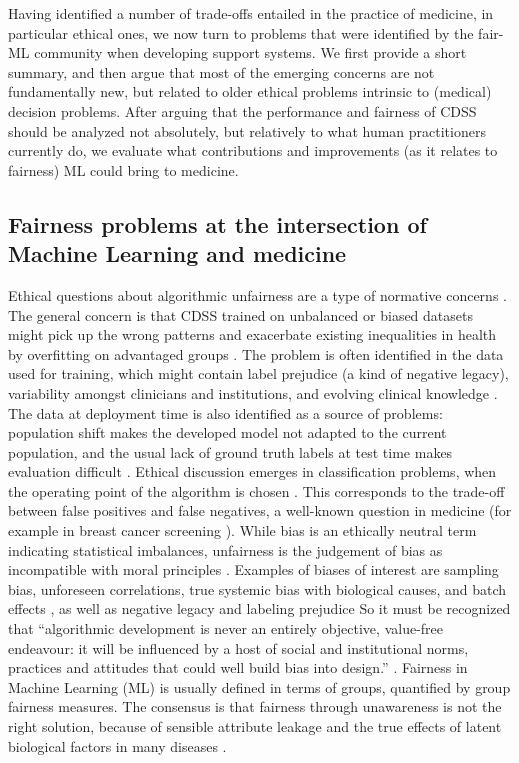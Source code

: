 Having identified a number of trade-offs entailed in the practice of medicine, in particular ethical ones, we now turn to problems that were identified by the fair-ML community when developing support systems.
We first provide a short summary, and then argue that most of the emerging concerns are not fundamentally new, but related to older ethical problems intrinsic to (medical) decision problems.
After arguing that the performance and fairness of CDSS should be analyzed not absolutely, but relatively to what human practitioners currently do,
we evaluate what contributions and improvements (as it relates to fairness) ML could bring to medicine. 


\subsection{Fairness problems at the intersection of Machine Learning and medicine}
    Ethical questions about algorithmic unfairness are a type of normative concerns \cite{Morley2020}.
    The general concern is that CDSS trained on unbalanced or biased datasets might pick up the wrong patterns and exacerbate existing inequalities in health by overfitting on advantaged groups \cite{Morley2020}\cite{Chen2021}.
    The problem is often identified in the data used for training, which might contain label prejudice (a kind of negative legacy), variability amongst clinicians and institutions, and evolving clinical knowledge \cite{Chen2021}.
    The data at deployment time is also identified as a source of problems: population shift makes the developed model not adapted to the current population, and the usual lack of ground truth labels at test time makes evaluation difficult \cite{Chen2021}.
    Ethical discussion emerges in classification problems, when the operating point of the algorithm is chosen \cite{Fletcher2021}.
    This corresponds to the trade-off between false positives and false negatives, a well-known question in medicine (for example in breast cancer screening \cite{Fletcher2021}).
    While bias is an ethically neutral term indicating statistical imbalances, unfairness is the judgement of bias as incompatible with moral principles \cite{Fletcher2021}.
    Examples of biases of interest are sampling bias, unforeseen correlations, true systemic bias with biological causes, and batch effects \cite{Fletcher2021}, as well as negative legacy and labeling prejudice \cite{Chen2021}
    So it must be recognized that ``algorithmic development is never an entirely objective, value-free endeavour: it will be influenced by a host of social and institutional norms, practices and attitudes that could well build bias into design.'' \cite[p.~673]{Zerilli2019}.
    Fairness in Machine Learning (ML) is usually defined in terms of groups, quantified by group fairness measures.
    The consensus is that fairness through unawareness is not the right solution, because of sensible attribute leakage and the true effects of latent biological factors in many diseases \cite{Chen2021}.



